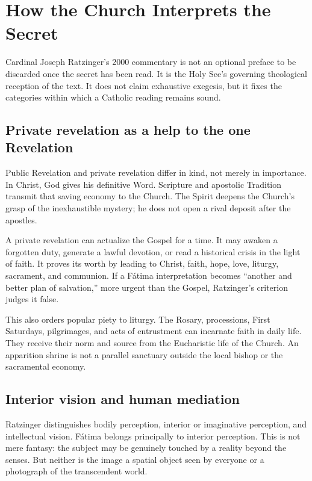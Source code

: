 \section{How the Church Interprets the Secret}

Cardinal Joseph Ratzinger's 2000 commentary is not an optional preface to be discarded once the secret has been read. It is the Holy See's governing theological reception of the text. It does not claim exhaustive exegesis, but it fixes the categories within which a Catholic reading remains sound.

\subsection{Private revelation as a help to the one Revelation}

Public Revelation and private revelation differ in kind, not merely in importance. In Christ, God gives his definitive Word. Scripture and apostolic Tradition transmit that saving economy to the Church. The Spirit deepens the Church's grasp of the inexhaustible mystery; he does not open a rival deposit after the apostles.

A private revelation can actualize the Gospel for a time. It may awaken a forgotten duty, generate a lawful devotion, or read a historical crisis in the light of faith. It proves its worth by leading to Christ, faith, hope, love, liturgy, sacrament, and communion. If a Fátima interpretation becomes “another and better plan of salvation,” more urgent than the Gospel, Ratzinger's criterion judges it false.

This also orders popular piety to liturgy. The Rosary, processions, First Saturdays, pilgrimages, and acts of entrustment can incarnate faith in daily life. They receive their norm and source from the Eucharistic life of the Church. An apparition shrine is not a parallel sanctuary outside the local bishop or the sacramental economy.

\subsection{Interior vision and human mediation}

Ratzinger distinguishes bodily perception, interior or imaginative perception, and intellectual vision. Fátima belongs principally to interior perception. This is not mere fantasy: the subject may be genuinely touched by a reality beyond the senses. But neither is the image a spatial object seen by everyone or a photograph of the transcendent world.

